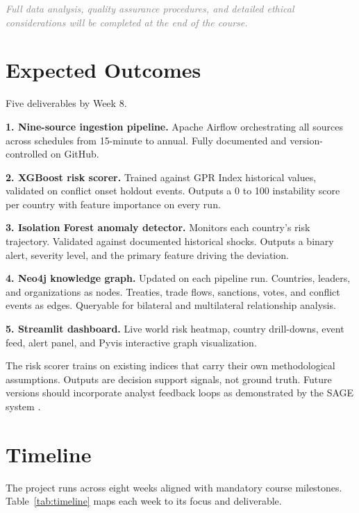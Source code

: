 \documentclass[12pt, onecolumn]{IEEEtran}
\newcommand{\placeholder}[1]{\textit{\textcolor{gray}{#1}}}
\begin{document}
\placeholder{Full data analysis, quality assurance procedures, and detailed ethical considerations will be completed at the end of the course.}


\section{Expected Outcomes}

Five deliverables by Week 8.

\textbf{1. Nine-source ingestion pipeline.} Apache Airflow orchestrating all sources across schedules from 15-minute to annual. Fully documented and version-controlled on GitHub.

\textbf{2. XGBoost risk scorer.} Trained against GPR Index historical values, validated on conflict onset holdout events. Outputs a 0 to 100 instability score per country with feature importance on every run.

\textbf{3. Isolation Forest anomaly detector.} Monitors each country's risk trajectory. Validated against documented historical shocks. Outputs a binary alert, severity level, and the primary feature driving the deviation.

\textbf{4. Neo4j knowledge graph.} Updated on each pipeline run. Countries, leaders, and organizations as nodes. Treaties, trade flows, sanctions, votes, and conflict events as edges. Queryable for bilateral and multilateral relationship analysis.

\textbf{5. Streamlit dashboard.} Live world risk heatmap, country drill-downs, event feed, alert panel, and Pyvis interactive graph visualization.

The risk scorer trains on existing indices that carry their own methodological assumptions. Outputs are decision support signals, not ground truth. Future versions should incorporate analyst feedback loops as demonstrated by the SAGE system \cite{sage2024}.


\section{Timeline}

The project runs across eight weeks aligned with mandatory course milestones. Table~\ref{tab:timeline} maps each week to its focus and deliverable.
\end{document}
